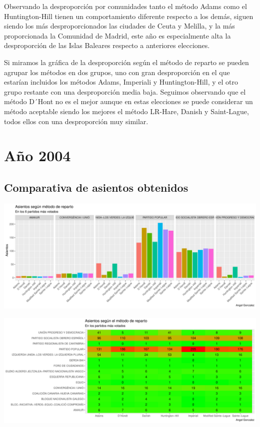 \documentclass[12pt,a4paper,]{book}
\numberwithin{dummy}{section}
\theoremstyle{ocrenumbox}
\theoremstyle{blacknumex}
\theoremstyle{blacknumbox}
\theoremstyle{ocrenum}
\theoremstyle{ocrenum}
\begin{document}
Observando la desproporción por comunidades tanto el método Adams como
el Huntington-Hill tienen un comportamiento diferente respecto a los
demás, siguen siendo los más desproporcionados las ciudades de Ceuta y
Melilla, y la más proporcionada la Comunidad de Madrid, este año es
especialmente alta la desproporción de las Islas Baleares respecto a
anteriores elecciones.

Si miramos la gráfica de la desproporción según el método de reparto se
pueden agrupar los métodos en dos grupos, uno con gran desproporción en
el que estarían incluidos los métodos Adams, Imperiali y
Huntington-Hill, y el otro grupo restante con una desproporción media
baja. Seguimos observando que el método D´Hont no es el mejor aunque en
estas elecciones se puede considerar un método aceptable siendo los
mejores el método LR-Hare, Danish y Saint-Lague, todos ellos con una
desproporción muy similar.

\hypertarget{auxf1o-2004}{%
\section{Año 2004}\label{auxf1o-2004}}

\hypertarget{comparativa-de-asientos-obtenidos-8}{%
\subsection{Comparativa de asientos
obtenidos}\label{comparativa-de-asientos-obtenidos-8}}

\begin{center}\includegraphics[width=1\linewidth]{figurasR/unnamed-chunk-100-1} \end{center}

\begin{center}\includegraphics[width=1\linewidth]{figurasR/unnamed-chunk-100-2} \end{center}
\end{document}
